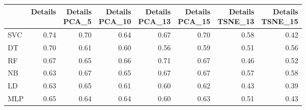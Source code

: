 \documentclass[12pt,italian]{report}
\begin{document}
\begin{table}[h]
	\begin{center}
		\begin{adjustbox}{max width=\textwidth, max totalheight= {4cm}}
			\begin{tabular}{lrrrrrrr}
				\toprule
				{} &   Details &  \thead{Details\\PCA\_5} &  \thead{Details\\PCA\_10} &  \thead{Details\\PCA\_13} &  \thead{Details\\PCA\_15} &  \thead{Details\\TSNE\_13} &  \thead{Details\\TSNE\_15} \\
				\midrule
				SVC &  0.74 &                  0.70 &                   0.64 &                   0.67 &                   0.70 &                    0.58 &                    0.42 \\
				DT  &  0.70 &                  0.61 &                   0.60 &                   0.56 &                   0.59 &                    0.51 &                    0.56 \\
				RF  &  0.67 &                  0.65 &                   0.66 &                   0.71 &                   0.67 &                    0.46 &                    0.52 \\
				NB  &  0.63 &                  0.67 &                   0.65 &                   0.67 &                   0.67 &                    0.57 &                    0.58 \\
				LD  &  0.63 &                  0.65 &                   0.61 &                   0.60 &                   0.62 &                    0.43 &                    0.39 \\
				MLP &  0.65 &                  0.64 &                   0.64 &                   0.60 &                   0.63 &                    0.51 &                    0.43 \\
				\bottomrule
			\end{tabular}
		\end{adjustbox}
	\end{center}
\end{table}
\end{document}
